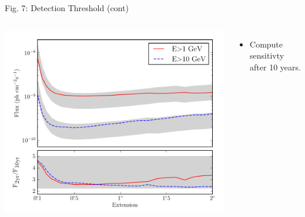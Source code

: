\documentclass[12pt]{beamer}
\begin{document}
\begin{frame}{Fig. 7: Detection Threshold (cont)}
  \begin{columns}
    \includegraphics[scale=0.5]{plots/time_sensitivity_color.pdf}
    \begin{itemize}
      \item Compute sensitivty after 10 years.
    \end{itemize}
  \end{columns}
\end{frame}
\end{document}
